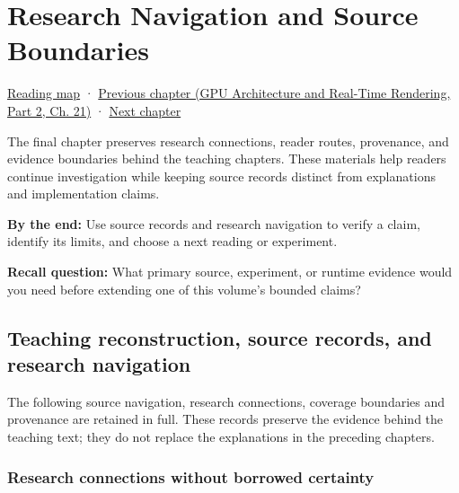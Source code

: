 \chapter{Research Navigation and Source Boundaries}\label{02-foundations-ii-ch039-research-navigation-and-source-boundaries}\hypertarget{02-foundations-ii-ch039}{}\label{stagechapter:02-foundations-ii-ch039}

\hypertarget{02-foundations-ii-ch039-research-navigation-and-source-boundaries}{}

\hyperref[volume-reading-map]{Reading map} · \href{../06-GPU-Architecture-and-Real-Time-Rendering-P02/main.pdf\#06-engine-ii-ch045}{Previous chapter (GPU Architecture and Real-Time Rendering, Part 2, Ch. 21)} · \hyperref[04-visual-computing-ii-ch031]{Next chapter}

The final chapter preserves research connections, reader routes, provenance, and evidence boundaries behind the teaching chapters. These materials help readers continue investigation while keeping source records distinct from explanations and implementation claims.

\textbf{By the end:} Use source records and research navigation to verify a claim, identify its limits, and choose a next reading or experiment.

\textbf{Recall question:} What primary source, experiment, or runtime evidence would you need before extending one of this volume's bounded claims?

\section{Teaching reconstruction, source records, and research navigation}\label{02-foundations-ii-ch039-teaching-reconstruction-source-records-and-research-navigation}

\hypertarget{02-foundations-ii-ch039-teaching-reconstruction-source-records-and-research-navigation}{}

The following source navigation, research connections, coverage boundaries and provenance are retained in full. These records preserve the evidence behind the teaching text; they do not replace the explanations in the preceding chapters.

\subsection{Research connections without borrowed certainty}\label{02-foundations-ii-ch039-research-connections-without-borrowed-certainty}

